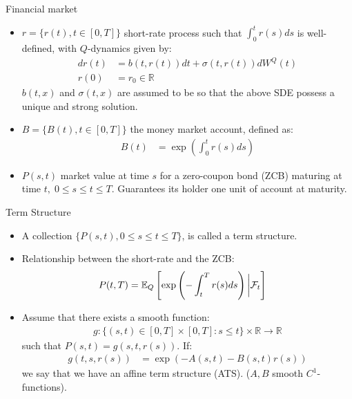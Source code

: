 \documentclass[UKenglish]{beamer}
\newcommand{\E}{\mathbb{E}}  %
\newcommand{\F}{\mathcal{F}} %
\newcommand{\R}{\mathbb{R}}  %
\begin{document}
\begin{frame}{Financial market}
\begin{itemize}
    \item $r = \{r(t), t\in [0,T]\}$ short-rate process such that $\int_{0}^{t}r(s)ds$ is well-defined, with $Q$-dynamics given by: 
    \begin{align*}
    dr(t) &= b(t,r(t))dt + \sigma(t,r(t))dW^{Q}(t)  \\
    r(0) &= r_{0} \in \R
    \end{align*}
    $b(t,x)$ and $\sigma(t,x)$ are assumed to be so 
    that the above SDE possess a unique and strong solution. 
    \item $B = \{B(t), t\in [0,T]\}$ the money market account, defined as: 
    \begin{align*}
        B(t) &= \exp\left(
        \int_{0}^{t}r(s)ds
        \right)
    \end{align*}
    \item $P(s,t)$ market value at time $s$ for a zero-coupon bond (ZCB) maturing at time $t,\; 0\leq s\leq t \leq T$. Guarantees its holder one unit of account at maturity. 
\end{itemize}
\end{frame}

\begin{frame}{Term Structure}
    \begin{itemize}
        \item A collection $\{P(s,t), 0\leq s \leq t \leq T\}$,  is called a term structure.
        \item Relationship between the short-rate and the ZCB:
        \begin{align*}
        P(t,T) &= \E_{Q}\left[
        \exp\left(
        -\int_{t}^{T}r(s)ds
        \right)\bigg{|}\F_{t}
        \right]    
        \end{align*}
    \item Assume that there exists a smooth function: 
    \begin{align*}
        g:\{(s,t)\in [0,T]\times [0,T]: s\leq t\}\times \R \to \R
    \end{align*}
    such that $P(s,t) = g(s,t,r(s))$. If: 
    \begin{align*}
    g(t,s,r(s)) &= \exp\left(
    -A(s,t)-B(s,t)r(s)
    \right)    
    \end{align*}
    we say that we have an affine term structure (ATS). ($A,B$ smooth $C^{1}$-functions).  
    \end{itemize}
\end{frame}
\end{document}
